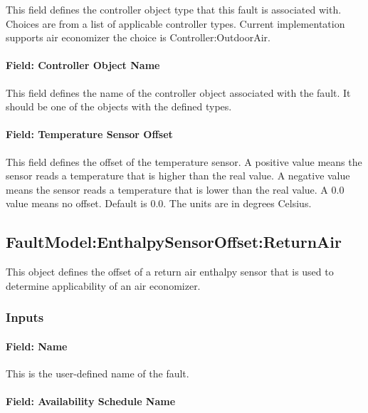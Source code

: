 This field defines the controller object type that this fault is associated with. Choices are from a list of applicable controller types. Current implementation supports air economizer the choice is Controller:OutdoorAir.

\paragraph{Field: Controller Object Name}\label{field-controller-object-name-3}

This field defines the name of the controller object associated with the fault. It should be one of the objects with the defined types.

\paragraph{Field: Temperature Sensor Offset}\label{field-temperature-sensor-offset-1}

This field defines the offset of the temperature sensor. A positive value means the sensor reads a temperature that is higher than the real value. A negative value means the sensor reads a temperature that is lower than the real value. A 0.0 value means no offset. Default is 0.0. The units are in degrees Celsius.

\subsection{FaultModel:EnthalpySensorOffset:ReturnAir}\label{faultmodelenthalpysensoroffsetreturnair}

This object defines the offset of a return air enthalpy sensor that is used to determine applicability of an air economizer.

\subsubsection{Inputs}\label{inputs-4-020}

\paragraph{Field: Name}\label{field-name-4-017}

This is the user-defined name of the fault.

\paragraph{Field: Availability Schedule Name}\label{field-availability-schedule-name-4-004}

